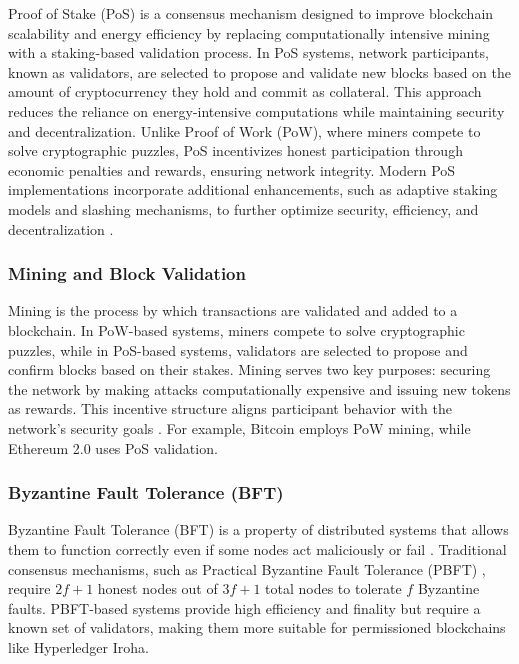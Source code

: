 \documentclass[final]{rc-book-2.14}
\begin{document}
Proof of Stake (PoS) is a consensus mechanism designed to improve blockchain scalability and energy efficiency by replacing computationally intensive mining with a staking-based validation process. In PoS systems, network participants, known as validators, are selected to propose and validate new blocks based on the amount of cryptocurrency they hold and commit as collateral. This approach reduces the reliance on energy-intensive computations while maintaining security and decentralization. Unlike Proof of Work (PoW), where miners compete to solve cryptographic puzzles, PoS incentivizes honest participation through economic penalties and rewards, ensuring network integrity. Modern PoS implementations incorporate additional enhancements, such as adaptive staking models and slashing mechanisms, to further optimize security, efficiency, and decentralization \cite{kiayias2017}.


\subsubsection{Mining and Block Validation}
Mining is the process by which transactions are validated and added to a blockchain. In PoW-based systems, miners compete to solve cryptographic puzzles, while in PoS-based systems, validators are selected to propose and confirm blocks based on their stakes. Mining serves two key purposes: securing the network by making attacks computationally expensive and issuing new tokens as rewards. This incentive structure aligns participant behavior with the network’s security goals \cite{bonneau2015sok}. For example, Bitcoin employs PoW mining, while Ethereum 2.0 uses PoS validation.

\subsubsection{Byzantine Fault Tolerance (BFT)}

Byzantine Fault Tolerance (BFT) is a property of distributed systems that allows them to function correctly even if some nodes act maliciously or fail \cite{lamport1982byzantine}. Traditional consensus mechanisms, such as Practical Byzantine Fault Tolerance (PBFT) \cite{castro1999practical}, require \(2f+1\) honest nodes out of \(3f+1\) total nodes to tolerate \(f\) Byzantine faults. PBFT-based systems provide high efficiency and finality but require a known set of validators, making them more suitable for permissioned blockchains like Hyperledger Iroha.
\end{document}
